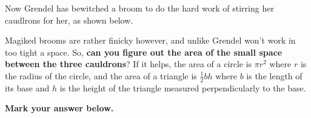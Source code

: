 


Now Grendel has bewitched a broom to do the hard work of stirring her
caudlrons for her, as shown below.

\begin{center}
\end{center}

Magiked brooms are rather finicky however, and unlike Grendel won't work
in too tight a space. So, \textbf{can you figure out the area of the small
space between the three cauldrons}? If it helps, the area of a circle is
\(\pi r^2\) where \(r\) is the radius of the circle, and the area of
a triangle is \(\frac{1}{2}bh\) where \(b\) is the length of its base
and \(h\) is the height of the triangle measured perpendicularly to the base.

\vspace{2em}

\textbf{Mark your answer below.}


